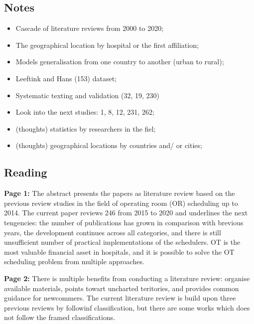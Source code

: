 \subsection{Notes}
    \begin{itemize}
        \item Cascade of literature reviews from 2000 to 2020;
        \item The geographical location by hospital or the first affiliation;
        \item Models generalisation from one country to another (urban to rural);
        \item Leeftink and Hans (153) dataset;
        \item Systematic texting and validation (32, 19, 230)
        \item Look into the next studies: 1, 8, 12, 231, 262;
        \item (thoughts) statistics by researchers in the fiel; 
        \item (thoughts) geographical locations by countries and/ or cities;
    \end{itemize}


\subsection{Reading}
    
    
    \textbf{Page 1:}
    The abstract presents the papers as literature review based on the previous review studies in the field of operating room (OR) scheduling up to 2014. The current paper reviews 246 from 2015 to 2020 and underlines the next tengencies: the number of publications has grown in comparison with brevious years, the development continues across all categories, and there is still unsufficient number of practical implementations of the schedulers. OT is the most valuable financial asset in hospitals, and it is possible to solve the OT scheduling problem from multiple approaches.
    
    \textbf{Page 2:}
    There is multiple benefits from conducting a literature review: organise available materials, points towart uncharted teritories, and provides common guidance for newcommers. The current literature review is build upon three previous reviews by followinf classification, but there are some works which does not follow the framed classifications.
    
